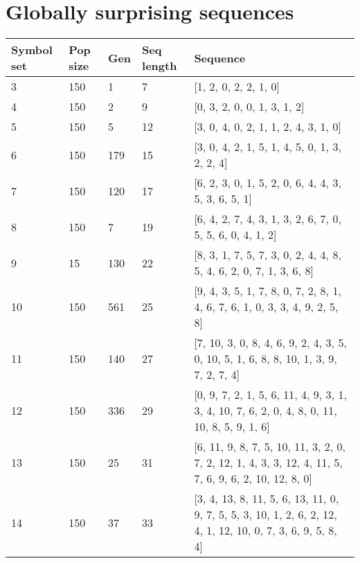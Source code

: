 \section{Globally surprising sequences}

\begin{table}[H]
\begin{tabularx}{\textwidth}{ l l l l X }

\hline
\hline
Symbol set & Pop size & Gen & Seq length & Sequence \\
\hline

3 & 150 & 1 & 7 & [1, 2, 0, 2, 2, 1, 0] \\

4 & 150 & 2 & 9 & [0, 3, 2, 0, 0, 1, 3, 1, 2] \\

5 & 150 & 5 & 12 & [3, 0, 4, 0, 2, 1, 1, 2, 4, 3, 1, 0] \\

6 & 150 & 179 & 15 & [3, 0, 4, 2, 1, 5, 1, 4, 5, 0, 1, 3, 2, 2, 4] \\

7 & 150 & 120 & 17 & [6, 2, 3, 0, 1, 5, 2, 0, 6, 4, 4, 3, 5, 3, 6, 5, 1] \\

8 & 150 & 7 & 19 & [6, 4, 2, 7, 4, 3, 1, 3, 2, 6, 7, 0, 5, 5, 6, 0, 4, 1, 2] \\

9 & 15 & 130 & 22 & [8, 3, 1, 7, 5, 7, 3, 0, 2, 4, 4, 8, 5, 4, 6, 2, 0, 7, 1, 3, 6, 8] \\

10 & 150 & 561 & 25 & [9, 4, 3, 5, 1, 7, 8, 0, 7, 2, 8, 1, 4, 6, 7, 6, 1, 0, 3, 3, 4, 9, 2, 5, 8] \\

11 & 150 & 140 & 27 & [7, 10, 3, 0, 8, 4, 6, 9, 2, 4, 3, 5, 0, 10, 5, 1, 6, 8, 8, 10, 1, 3, 9, 7, 2, 7, 4] \\

12 & 150 & 336 & 29 & [0, 9, 7, 2, 1, 5, 6, 11, 4, 9, 3, 1, 3, 4, 10, 7, 6, 2, 0, 4, 8, 0, 11, 10, 8, 5, 9, 1, 6] \\

13 & 150 & 25 & 31 & [6, 11, 9, 8, 7, 5, 10, 11, 3, 2, 0, 7, 2, 12, 1, 4, 3, 3, 12, 4, 11, 5, 7, 6, 9, 6, 2, 10, 12, 8, 0] \\

14 & 150 & 37 & 33 & [3, 4, 13, 8, 11, 5, 6, 13, 11, 0, 9, 7, 5, 5, 3, 10, 1, 2, 6, 2, 12, 4, 1, 12, 10, 0, 7, 3, 6, 9, 5, 8, 4] \\


\end{tabularx}
\end{table}
